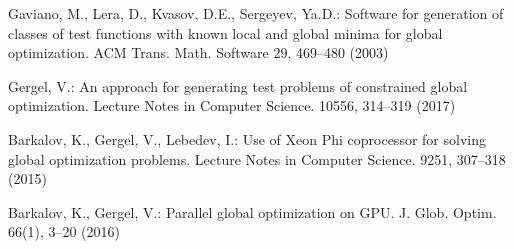 \documentclass[smallextended]{svjour3}       %
\begin{document}
\begin{thebibliography}{}
Gaviano, M., Lera, D., Kvasov, D.E., Sergeyev, Ya.D.: Software for generation of classes of test functions with known local and global minima for global optimization. ACM Trans. Math. Software 29, 469--480 (2003)




Gergel, V.: An approach for generating test problems of constrained global optimization. Lecture Notes in Computer Science. 10556, 314--319 (2017)

Barkalov, K., Gergel, V., Lebedev, I.: Use of Xeon Phi coprocessor for solving global optimization problems. Lecture Notes in Computer Science. 9251, 307--318 (2015)

Barkalov, K., Gergel, V.: Parallel global optimization on GPU. J. Glob. Optim. 66(1), 3--20 (2016)



%
\end{thebibliography}
\end{document}
